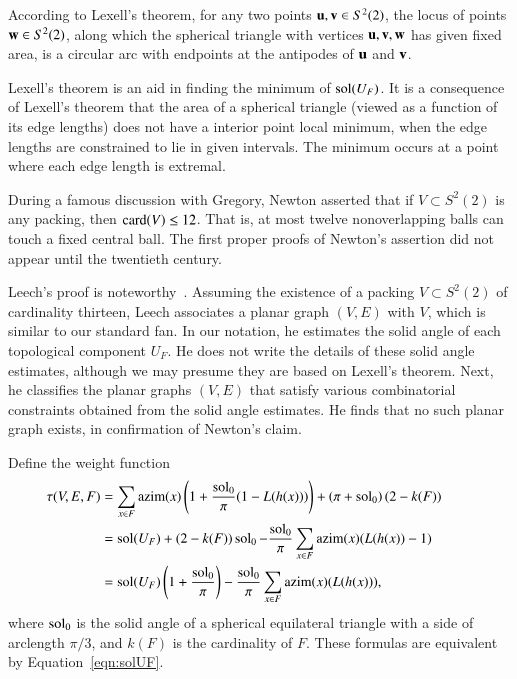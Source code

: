 \documentclass{llncs}
\def\op#1{{\hbox{#1}}}
\begin{document}
\begin{remark}
According to Lexell's theorem, for any two points ${\mathbf u},{\mathbf v}\in S^2(2)$,
the locus of points ${\mathbf w}\in S^2(2)$, along which
the spherical triangle with vertices ${\mathbf u},{\mathbf v},{\mathbf w}$ has given fixed area, is a circular arc
with endpoints at the antipodes of ${\mathbf u}$ and ${\mathbf v}$.

Lexell's theorem is an aid in finding the minimum of
  $\operatorname{sol}(U_F)$.
  It is a consequence of Lexell's theorem that the area of a spherical
  triangle (viewed as a function of its edge lengths) does not have a
  interior point local minimum, when the edge lengths are
  constrained to lie in given intervals.  The minimum occurs at a
  point where each edge length is extremal.
%
%
\end{remark}

\begin{remark}
During a famous discussion with Gregory, Newton asserted that 
if $V\subset S^2(2)$ is any packing, then $\card(V)\le 12$. That is, at most
twelve nonoverlapping balls can touch a fixed central ball.  The first proper
proofs of Newton's assertion did not appear until the twentieth century.
%
%
%
%
  
 Leech's proof is
noteworthy~\cite{Leech:1956:MG}.  Assuming the existence of a packing
$V\subset S^2(2)$ of cardinality thirteen, Leech associates a planar graph
$(V,E)$ with $V$, which is similar to our standard fan.  In
our notation, he estimates the solid angle of each topological
component $U_F$.  He does not write the details of these solid angle
estimates, although we may presume they are based on Lexell's theorem.
Next, he classifies the planar graphs $(V,E)$ that satisfy various
combinatorial constraints obtained from the solid angle estimates. He
finds that no such planar graph exists, in confirmation of Newton's
claim.
\end{remark}

Define the weight function
\begin{align}
  \tau(V,E,F) &=\sum_{x\in F} \op{azim}(x)
  \left(1 + \dfrac{\sol_0}{\pi}(1- L(h(x)))\right) 
  + \left(\pi+{\sol_0}\right) (2- k(F))\qquad\phantom{t}\vspace{6pt}\nonumber\\
  &= \sol(U_F) + (2- k(F))\sol_0 - \dfrac{\sol_0}{\pi}
\sum_{x\in F}\op{azim}(x) (L(h(x)) - 1)\vspace{6pt}\nonumber\\
  &= \sol(U_F) \left( 1 + \dfrac{\sol_0}{\pi}\right) 
- \dfrac{\sol_0}{\pi} \sum_{x\in F} \op{azim}(x)(L(h(x))),\label{eqn:tau-sol}
\end{align}
where $\operatorname{sol}_0$ is the solid angle of a spherical equilateral triangle with a side of arclength $\pi/3$, and $k(F)$ is the cardinality of $F$.
% 
These formulas are equivalent by Equation~\ref{eqn:solUF}.  
\end{document}
